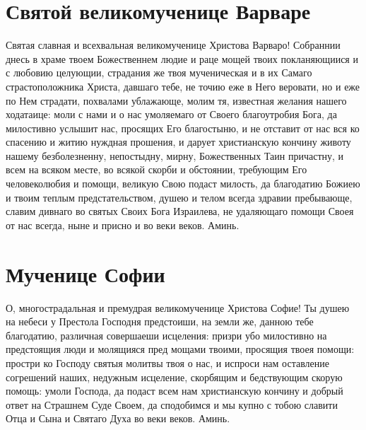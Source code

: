 \section{Святой великомученице Варваре}\begin{mymulticols}




Святая славная и всехвальная великомученице Христова Варваро! Собраннии днесь в храме твоем Божественнем людие и раце мощей твоих покланяющиися и с любовию целующии, страдания же твоя мученическая и в их Самаго страстоположника Христа, давшаго тебе, не точию еже в Него веровати, но и еже по Нем страдати, похвалами ублажающе, молим тя, известная желания нашего ходатаице: моли с нами и о нас умоляемаго от Своего благоутробия Бога, да милостивно услышит нас, просящих Его благостыню, и не отставит от нас вся ко спасению и житию нуждная прошения, и дарует христианскую кончину животу нашему безболезненну, непостыдну, мирну, Божественных Таин причастну, и всем на всяком месте, во всякой скорби и обстоянии, требующим Его человеколюбия и помощи, великую Свою подаст милость, да благодатию Божиею и твоим теплым предстательством, душею и телом всегда здравии пребывающе, славим дивнаго во святых Своих Бога Израилева, не удаляющаго помощи Своея от нас всегда, ныне и присно и во веки веков. Аминь.


\end{mymulticols}

\mychapterending





\section{Мученице Софии}\begin{mymulticols}



О, многострадальная и премудрая великомученице Христова Софие! Ты душею на небеси у Престола Господня предстоиши, на земли же, данною тебе благодатию, различная совершаеши исцеления: призри убо милостивно на предстоящия люди и молящияся пред мощами твоими, просящия твоея помощи: простри ко Господу святыя молитвы твоя о нас, и испроси нам оставление согрешений наших, недужным исцеление, скорбящим и бедствующим скорую помощь: умоли Господа, да подаст всем нам христианскую кончину и добрый ответ на Страшнем Суде Своем, да сподобимся и мы купно с тобою славити Отца и Сына и Святаго Духа во веки веков. Аминь.

\end{mymulticols}

